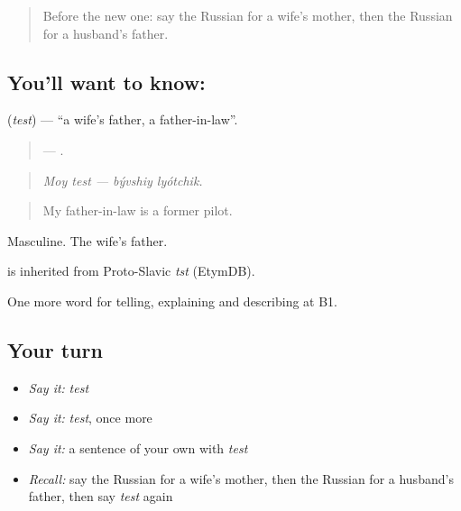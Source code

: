 \label{lesson:RU-C491-test}



\begin{quote}
Before the new one: say the Russian for a wife's mother, then the Russian for a husband's father.
\end{quote}

\subsection*{You'll want to know: }
\textbf{} (\emph{test}) — \textquotedblleft{}a wife's father, a father-in-law\textquotedblright{}.

\begin{quote}
  —  .
\end{quote}

\begin{quote}
\emph{Moy test — bývshiy lyótchik.}
\end{quote}

\begin{quote}
My father-in-law is a former pilot.
\end{quote}

Masculine. The wife's father.

\begin{cousinweb}
\emph{} is inherited from Proto-Slavic \emph{tst} (EtymDB).
\end{cousinweb}

\begin{grammarlens}[title={What you've built}]
One more word for telling, explaining and describing at B1.
\end{grammarlens}

\subsection*{Your turn}
\begin{itemize}
\raggedright
  \item \emph{Say it:} \emph{test}
  \item \emph{Say it:} \emph{test}, once more
  \item \emph{Say it:} a sentence of your own with \emph{test}
  \item \emph{Recall:} say the Russian for a wife's mother, then the Russian for a husband's father, then say \emph{test} again
\end{itemize}

